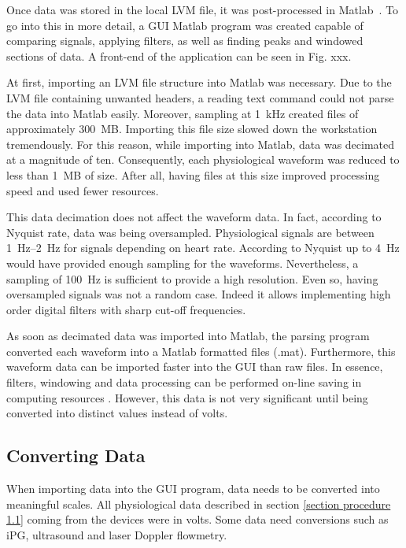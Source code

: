 Once data was stored in the local LVM file, it was post-processed in Matlab~\cite{MATLAB:2016}. To go into this in more detail, a GUI Matlab program was created capable of comparing signals, applying filters, as well as finding peaks and windowed sections of data. A front-end of the application can be seen in Fig. xxx.


At first, importing an LVM file structure into Matlab was necessary. Due to the LVM file containing unwanted headers, a reading text command could not parse the data into Matlab easily. Moreover, sampling at \SI{1}{\kilo\hertz} created files of approximately \SI{300}{MB}. Importing this file size slowed down the workstation tremendously. For this reason, while importing into Matlab, data was decimated at a magnitude of ten. Consequently, each physiological waveform was reduced to less than \SI{1}{MB} of size. After all, having files at this size improved processing speed and used fewer resources. 


This data decimation does not affect the waveform data. In fact, according to Nyquist rate, data was being oversampled. Physiological signals are between \SIrange{1}{2}{\hertz} for signals depending on heart rate. According to Nyquist up to \SI{4}{\hertz} would have provided enough sampling for the waveforms. Nevertheless, a sampling of \SI{100}{\hertz} is sufficient to provide a high resolution. Even so, having oversampled signals was not a random case. Indeed it allows implementing high order digital filters with sharp cut-off frequencies. 


As soon as decimated data was imported into Matlab, the parsing program converted each waveform into a Matlab formatted files (.mat). Furthermore, this waveform data can be imported faster into the GUI than raw files. In essence, filters, windowing and data processing can be performed on-line saving in computing resources . However, this data is not very significant until being converted into distinct values instead of volts.

\subsection{Converting Data}
\label{section procedure 3.1}
When importing data into the GUI program, data needs to be converted into meaningful scales. All physiological data described in section \ref{section procedure 1.1} coming from the devices were in volts. Some data need conversions such as iPG, ultrasound and laser Doppler flowmetry.

